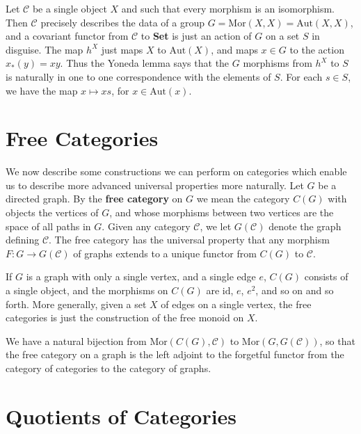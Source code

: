 \begin{example}
    Let $\mathcal{C}$ be a single object $X$ and such that every morphism is an isomorphism. Then $\mathcal{C}$ precisely describes the data of a group $G = \text{Mor}(X,X) = \text{Aut}(X,X)$, and a covariant functor from $\mathcal{C}$ to {\bf Set} is just an action of $G$ on a set $S$ in disguise. The map $h^X$ just maps $X$ to $\text{Aut}(X)$, and maps $x \in G$ to the action $x_*(y) = xy$. Thus the Yoneda lemma says that the $G$ morphisms from $h^X$ to $S$ is naturally in one to one correspondence with the elements of $S$. For each $s \in S$, we have the map $x \mapsto xs$, for $x \in \text{Aut}(x)$.
\end{example}

\section{Free Categories}

We now describe some constructions we can perform on categories which enable us to describe more advanced universal properties more naturally. Let $G$ be a directed graph. By the {\bf free category} on $G$ we mean the category $C(G)$ with objects the vertices of $G$, and whose morphisms between two vertices are the space of all paths in $G$. Given any category $\mathcal{C}$, we let $G(\mathcal{C})$ denote the graph defining $\mathcal{C}$. The free category has the universal property that any morphism $F: G \to G(\mathcal{C})$ of graphs extends to a unique functor from $C(G)$ to $\mathcal{C}$.

\begin{example}
    If $G$ is a graph with only a single vertex, and a single edge $e$, $C(G)$ consists of a single object, and the morphisms on $C(G)$ are $\text{id}$, $e$, $e^2$, and so on and so forth. More generally, given a set $X$ of edges on a single vertex, the free categories is just the construction of the free monoid on $X$.
\end{example}

We have a natural bijection from $\text{Mor}(C(G), \mathcal{C})$ to $\text{Mor}(G, G(\mathcal{C}))$, so that the free category on a graph is the left adjoint to the forgetful functor from the category of categories to the category of graphs.

\section{Quotients of Categories}

